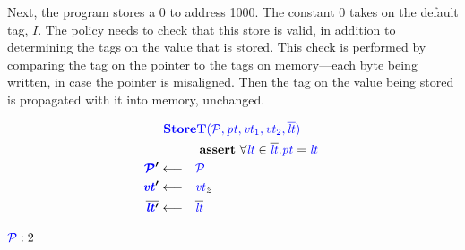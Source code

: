 \documentclass[acmsmall,review,anonymous]{acmart}\settopmatter{printfolios=true,printccs=false,printacmref=false}
\begin{document}
Next, the program stores a 0 to address 1000. The constant 0
takes on the default tag, \(I\). The policy needs to check that
this store is valid, in addition to determining the tags on the value that is stored.
This check is performed by comparing the tag on the pointer to the tags on memory---each
byte being written, in case the pointer is misaligned. Then the tag on the value being stored
is propagated with it into memory, unchanged.

\[\begin{aligned}
\truledef{\storet}
\assert{\forall \lt \in \overline{\lt} . \pt = \lt}
\settag{\PCT'}{\PCT}
\settag{\vt'}{\vt_2}
\settag{\overline{\lt'}}{\overline{\lt}}
\end{aligned}\]

\vspace{\abovedisplayskip}

\(\mathcal{\color{blue} P}: 2\)

\vspace{\abovedisplayskip}
\end{document}
